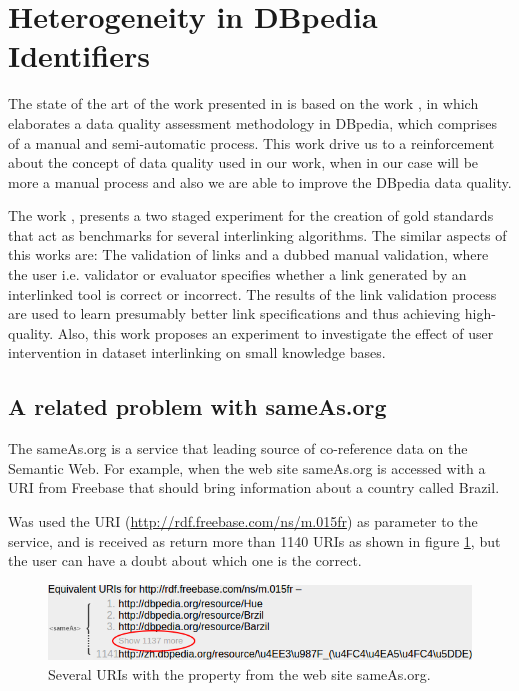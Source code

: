\section{Heterogeneity in DBpedia Identifiers}
The state of the art of the work presented in \cite{valdestilhasdbpediasameas} is based on the work \cite{anra2013}, in which elaborates a data quality assessment methodology in DBpedia, which comprises of a manual and semi-automatic process. This work drive us to a reinforcement about the concept of data quality used in our work, when in our case will be more a manual process and also we are able to improve the DBpedia data quality.

The work \cite{mofeed2015}, presents a two staged experiment for the creation of gold standards that act as benchmarks for several interlinking algorithms. The similar aspects of this works are: The validation of links and a dubbed manual validation, where the user i.e. validator or evaluator specifies whether a link generated by an interlinked tool is correct or incorrect. The results of the link validation process are used to learn presumably better link specifications and thus achieving high-quality.
Also, this work proposes an experiment to investigate the effect of user intervention in dataset interlinking on small knowledge bases. 

\subsection{A related problem with sameAs.org}
The sameAs.org is a service that leading source of co-reference data on the Semantic Web.
For example, when the web site sameAs.org is accessed with a URI from Freebase that should bring information about a country called Brazil.

Was used the URI (\url{http://rdf.freebase.com/ns/m.015fr}) as parameter to the service, and is received as return more than 1140 URIs as shown in figure \ref{fig:sameasorg}, but the user can have a doubt about which one is the correct.

\begin{figure}[hbt] 
  	\centering
	\includegraphics[width=\columnwidth]{img/sameasorg.png}
 	\caption{Several URIs with the property  from the web site sameAs.org.}
  	\label{fig:sameasorg}
\end{figure}

